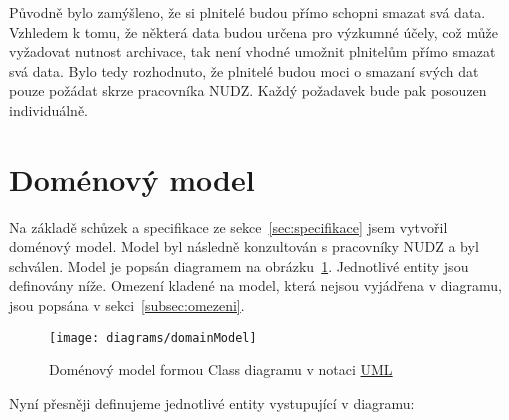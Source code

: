 Původně bylo zamýšleno, že si plnitelé budou přímo schopni smazat svá data.
Vzhledem k tomu, že některá data budou určena pro výzkumné účely, což může vyžadovat nutnost archivace, tak není vhodné umožnit plnitelům přímo smazat svá data.
Bylo tedy rozhodnuto, že plnitelé budou moci o smazaní svých dat pouze požádat skrze pracovníka NUDZ\@.
Každý požadavek bude pak posouzen individuálně.


\section{Doménový model}\label{sec:domenovy-model}

Na základě schůzek a specifikace ze sekce~\ref{sec:specifikace} jsem vytvořil doménový model.
Model byl následně konzultován s pracovníky NUDZ a byl schválen.
Model je popsán diagramem na obrázku~\ref{fig:domain-model}.
Jednotlivé entity jsou definovány níže.
Omezení kladené na model, která nejsou vyjádřena v diagramu, jsou popsána v sekci~\ref{subsec:omezeni}.

\begin{figure}[H]
    \texttt{[image: diagrams/domainModel]}
    \caption[asdf]{Doménový model formou Class diagramu v notaci \href{https://www.omg.org/spec/UML/2.5.1/PDF}{UML}\footnotemark}\label{fig:domain-model}
\end{figure}


Nyní přesněji definujeme jednotlivé entity vystupující v diagramu:

